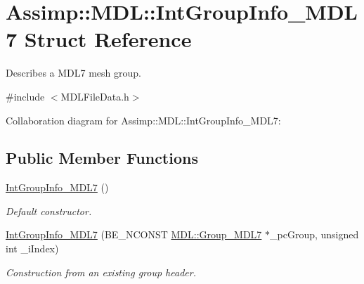 \hypertarget{struct_assimp_1_1_m_d_l_1_1_int_group_info___m_d_l7}{\section{Assimp\+:\+:M\+D\+L\+:\+:Int\+Group\+Info\+\_\+\+M\+D\+L7 Struct Reference}
\label{struct_assimp_1_1_m_d_l_1_1_int_group_info___m_d_l7}
}


Describes a M\+D\+L7 mesh group.  




{\ttfamily \#include $<$M\+D\+L\+File\+Data.\+h$>$}



Collaboration diagram for Assimp\+:\+:M\+D\+L\+:\+:Int\+Group\+Info\+\_\+\+M\+D\+L7\+:
\subsection*{Public Member Functions}
\begin{DoxyCompactItemize}
\item 
\hypertarget{struct_assimp_1_1_m_d_l_1_1_int_group_info___m_d_l7_aa7d50b7f8f284833b83c87ed42468a96}{\hyperlink{struct_assimp_1_1_m_d_l_1_1_int_group_info___m_d_l7_aa7d50b7f8f284833b83c87ed42468a96}{Int\+Group\+Info\+\_\+\+M\+D\+L7} ()}\label{struct_assimp_1_1_m_d_l_1_1_int_group_info___m_d_l7_aa7d50b7f8f284833b83c87ed42468a96}

\begin{DoxyCompactList}\small\item\em Default constructor. \end{DoxyCompactList}\item 
\hypertarget{struct_assimp_1_1_m_d_l_1_1_int_group_info___m_d_l7_ad40ad1cfa270ed2cb3c96fb80b39ac95}{\hyperlink{struct_assimp_1_1_m_d_l_1_1_int_group_info___m_d_l7_ad40ad1cfa270ed2cb3c96fb80b39ac95}{Int\+Group\+Info\+\_\+\+M\+D\+L7} (B\+E\+\_\+\+N\+C\+O\+N\+S\+T \hyperlink{struct_assimp_1_1_m_d_l_1_1_group___m_d_l7}{M\+D\+L\+::\+Group\+\_\+\+M\+D\+L7} $\ast$\+\_\+pc\+Group, unsigned int \+\_\+i\+Index)}\label{struct_assimp_1_1_m_d_l_1_1_int_group_info___m_d_l7_ad40ad1cfa270ed2cb3c96fb80b39ac95}

\begin{DoxyCompactList}\small\item\em Construction from an existing group header. \end{DoxyCompactList}\end{DoxyCompactItemize}
